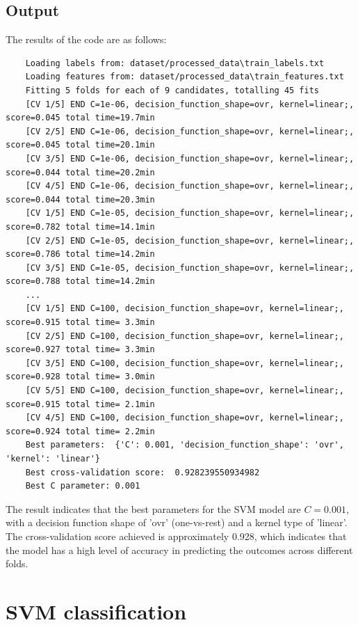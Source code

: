 \documentclass[lang=cn]{elegantpaper}
\begin{document}
\subsection{Output}

The results of the code are as follows:

\begin{lstlisting}
    Loading labels from: dataset/processed_data\train_labels.txt
    Loading features from: dataset/processed_data\train_features.txt
    Fitting 5 folds for each of 9 candidates, totalling 45 fits
    [CV 1/5] END C=1e-06, decision_function_shape=ovr, kernel=linear;, score=0.045 total time=19.7min
    [CV 2/5] END C=1e-06, decision_function_shape=ovr, kernel=linear;, score=0.045 total time=20.1min
    [CV 3/5] END C=1e-06, decision_function_shape=ovr, kernel=linear;, score=0.044 total time=20.2min
    [CV 4/5] END C=1e-06, decision_function_shape=ovr, kernel=linear;, score=0.044 total time=20.3min
    [CV 1/5] END C=1e-05, decision_function_shape=ovr, kernel=linear;, score=0.782 total time=14.1min
    [CV 2/5] END C=1e-05, decision_function_shape=ovr, kernel=linear;, score=0.786 total time=14.2min
    [CV 3/5] END C=1e-05, decision_function_shape=ovr, kernel=linear;, score=0.788 total time=14.2min
    ...
    [CV 1/5] END C=100, decision_function_shape=ovr, kernel=linear;, score=0.915 total time= 3.3min
    [CV 2/5] END C=100, decision_function_shape=ovr, kernel=linear;, score=0.927 total time= 3.3min
    [CV 3/5] END C=100, decision_function_shape=ovr, kernel=linear;, score=0.928 total time= 3.0min
    [CV 5/5] END C=100, decision_function_shape=ovr, kernel=linear;, score=0.915 total time= 2.1min
    [CV 4/5] END C=100, decision_function_shape=ovr, kernel=linear;, score=0.924 total time= 2.2min
    Best parameters:  {'C': 0.001, 'decision_function_shape': 'ovr', 'kernel': 'linear'}
    Best cross-validation score:  0.928239550934982
    Best C parameter: 0.001
\end{lstlisting}

The result indicates that the best parameters for the SVM model are $C = 0.001$, with a decision function shape of 'ovr' (one-vs-rest) and a kernel type of 'linear'. The cross-validation score achieved is approximately 0.928, which indicates that the model has a high level of accuracy in predicting the outcomes across different folds.

\section{SVM classification}
\end{document}

